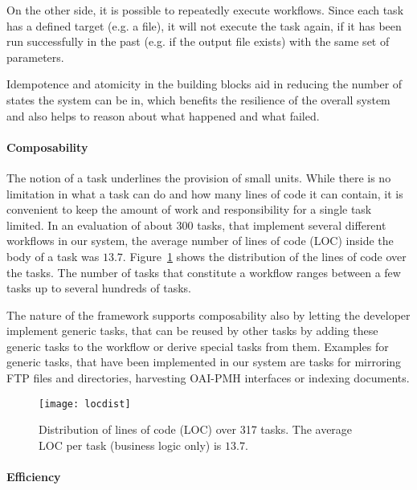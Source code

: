 \documentclass[english]{lni}
\begin{document}
On the other side, it is possible to repeatedly execute workflows.
Since each task has a defined target (e.g. a file), it will not execute
the task again, if it has been run successfully in the past (e.g. if the output file exists) with the same
set of parameters.

Idempotence and atomicity in the building blocks
aid in reducing the number of states the system
can be in, which benefits the resilience of the overall system and also
helps to reason about what happened and what failed.

\paragraph{Composability}
\label{composability}

The notion of a task underlines the provision of small units. While there is
no limitation in what a task can do and how many lines of code it can contain,
it is convenient to keep the amount of work and responsibility for a
single task limited. In an evaluation of about $300$ tasks, that
implement several different workflows in our system, the average number
of lines of code (LOC) inside the body of a task was $13.7$. Figure~\ref{locfreq} shows
the distribution of the lines of code over the tasks.
The number of tasks that constitute a workflow ranges between
a few tasks up to several hundreds of tasks.

The nature of the framework supports composability also by letting the
developer implement generic tasks, that can be reused by other tasks by
adding these generic tasks to the workflow or derive special tasks
from them. Examples for generic tasks, that have been implemented in our system are
tasks for mirroring FTP files and directories, harvesting OAI-PMH interfaces
or indexing documents.

\begin{figure}[htb]
\begin{center}
\texttt{[image: locdist]}
\caption{\label{locfreq}Distribution of lines of code (LOC) over 317 tasks. The average LOC per task (business logic only) is $13.7$.}
\end{center}
\end{figure}

\paragraph{Efficiency}
\end{document}
